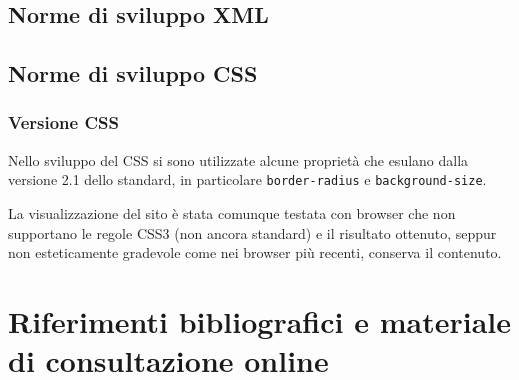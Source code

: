 \documentclass[10pt,a4paper,onecolumn]{article}
\begin{document}
\subsection{Norme di sviluppo XML}

\subsection{Norme di sviluppo CSS}

\subsubsection{Versione CSS}
Nello sviluppo del CSS si sono utilizzate alcune proprietà che esulano dalla versione 2.1 dello standard, in particolare \verb+border-radius+ e \verb+background-size+.

La visualizzazione del sito è stata comunque testata con browser che non supportano le regole CSS3 (non ancora standard) e il risultato ottenuto, seppur non esteticamente gradevole come nei browser più recenti, conserva il contenuto.

\clearpage

\section{Riferimenti bibliografici e materiale di consultazione online}
\end{document}
